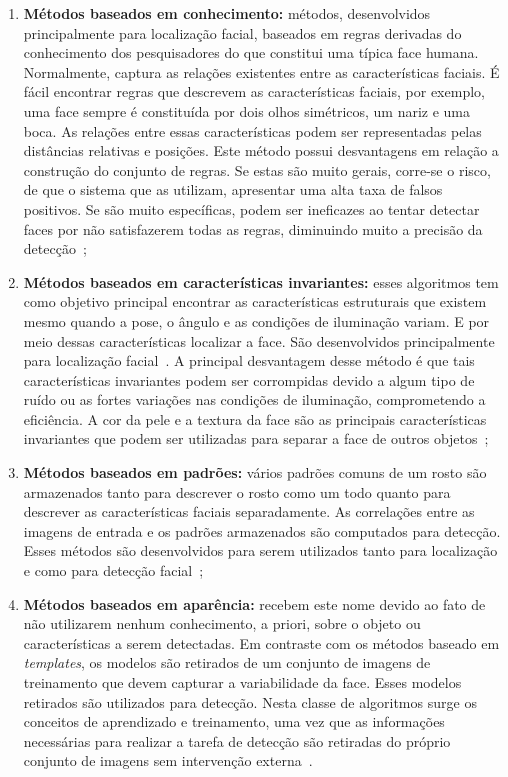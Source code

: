 	\begin{enumerate}
		\item \textbf{Métodos baseados em conhecimento:} métodos, desenvolvidos
		principalmente para localização facial, baseados em regras derivadas do
		conhecimento dos pesquisadores do que constitui uma típica face humana.
		Normalmente, captura as relações existentes entre as características faciais. É
		fácil encontrar regras que descrevem as características faciais, por exemplo,
		uma face sempre é constituída por dois olhos simétricos, um nariz e uma boca. As
		relações entre essas características podem ser representadas pelas distâncias
		relativas e posições. Este método possui desvantagens em relação a construção do
		conjunto de regras. Se estas são muito gerais, corre-se o risco, de que o
		sistema que as utilizam, apresentar uma alta taxa de falsos positivos. Se são
		muito específicas, podem ser ineficazes ao tentar detectar faces por não
		satisfazerem todas as regras, diminuindo muito a precisão da
		detecção~\cite{yang,lopes};
		
		\item \textbf{Métodos baseados em características invariantes:} esses algoritmos
		tem como objetivo principal encontrar as características estruturais que existem
		mesmo quando a pose, o ângulo e as condições de iluminação variam. E por meio
		dessas características localizar a face. São desenvolvidos principalmente para
		localização facial~\cite{yang}. A principal desvantagem desse método é que tais
		características invariantes podem ser corrompidas devido a algum tipo de ruído
		ou as fortes variações nas condições de iluminação, comprometendo a eficiência.
		A cor da pele e a textura da face são as principais características invariantes
		que podem ser utilizadas para separar a face de outros objetos~\cite{lopes};
		
		\item \textbf{Métodos baseados em padrões:} vários padrões comuns de um rosto
		são armazenados tanto para descrever o rosto como um todo quanto para descrever
		as características faciais separadamente. As correlações entre as imagens de
		entrada e os padrões armazenados são computados para detecção. Esses métodos são
		desenvolvidos para serem utilizados tanto para localização e como para detecção
		facial~\cite{yang};
		
		\item \textbf{Métodos baseados em aparência:} recebem este nome devido ao fato
		de não utilizarem nenhum conhecimento, a priori, sobre o objeto ou
		características a serem detectadas. Em contraste com os métodos baseado em
		\textit{templates}, os modelos são retirados de um conjunto de imagens de
		treinamento que devem capturar a variabilidade da face. Esses modelos retirados
		são utilizados para detecção. Nesta classe de algoritmos surge os conceitos de
		aprendizado e treinamento, uma vez que as informações necessárias para realizar
		a tarefa de detecção são retiradas do próprio conjunto de imagens sem
		intervenção externa~\cite{yang, lopes}.

	\end{enumerate}


